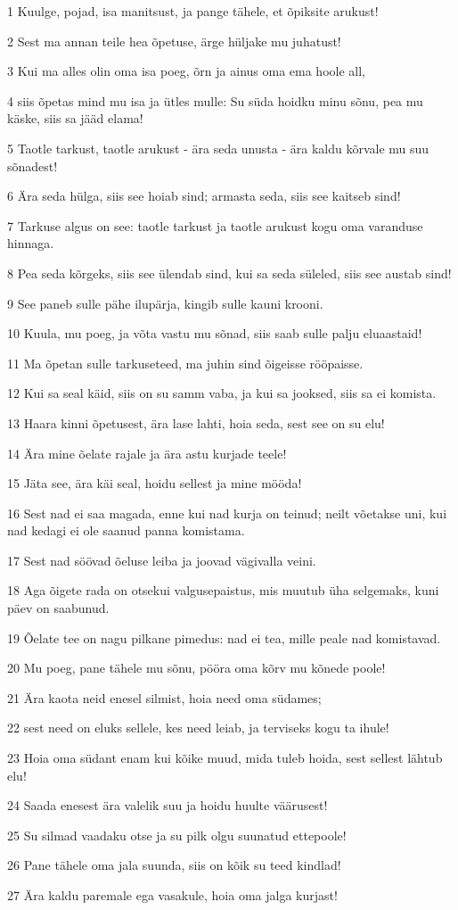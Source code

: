 \par 1 Kuulge, pojad, isa manitsust, ja pange tähele, et õpiksite arukust!
\par 2 Sest ma annan teile hea õpetuse, ärge hüljake mu juhatust!
\par 3 Kui ma alles olin oma isa poeg, õrn ja ainus oma ema hoole all,
\par 4 siis õpetas mind mu isa ja ütles mulle: Su süda hoidku minu sõnu, pea mu käske, siis sa jääd elama!
\par 5 Taotle tarkust, taotle arukust - ära seda unusta - ära kaldu kõrvale mu suu sõnadest!
\par 6 Ära seda hülga, siis see hoiab sind; armasta seda, siis see kaitseb sind!
\par 7 Tarkuse algus on see: taotle tarkust ja taotle arukust kogu oma varanduse hinnaga.
\par 8 Pea seda kõrgeks, siis see ülendab sind, kui sa seda süleled, siis see austab sind!
\par 9 See paneb sulle pähe ilupärja, kingib sulle kauni krooni.
\par 10 Kuula, mu poeg, ja võta vastu mu sõnad, siis saab sulle palju eluaastaid!
\par 11 Ma õpetan sulle tarkuseteed, ma juhin sind õigeisse rööpaisse.
\par 12 Kui sa seal käid, siis on su samm vaba, ja kui sa jooksed, siis sa ei komista.
\par 13 Haara kinni õpetusest, ära lase lahti, hoia seda, sest see on su elu!
\par 14 Ära mine õelate rajale ja ära astu kurjade teele!
\par 15 Jäta see, ära käi seal, hoidu sellest ja mine mööda!
\par 16 Sest nad ei saa magada, enne kui nad kurja on teinud; neilt võetakse uni, kui nad kedagi ei ole saanud panna komistama.
\par 17 Sest nad söövad õeluse leiba ja joovad vägivalla veini.
\par 18 Aga õigete rada on otsekui valgusepaistus, mis muutub üha selgemaks, kuni päev on saabunud.
\par 19 Õelate tee on nagu pilkane pimedus: nad ei tea, mille peale nad komistavad.
\par 20 Mu poeg, pane tähele mu sõnu, pööra oma kõrv mu kõnede poole!
\par 21 Ära kaota neid enesel silmist, hoia need oma südames;
\par 22 sest need on eluks sellele, kes need leiab, ja terviseks kogu ta ihule!
\par 23 Hoia oma südant enam kui kõike muud, mida tuleb hoida, sest sellest lähtub elu!
\par 24 Saada enesest ära valelik suu ja hoidu huulte väärusest!
\par 25 Su silmad vaadaku otse ja su pilk olgu suunatud ettepoole!
\par 26 Pane tähele oma jala suunda, siis on kõik su teed kindlad!
\par 27 Ära kaldu paremale ega vasakule, hoia oma jalga kurjast!

